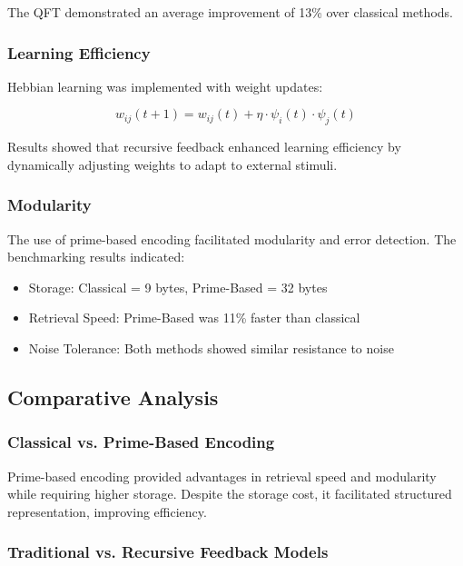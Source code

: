 \documentclass{article}
\theoremstyle{plain}
\begin{document}
\begin{itemize}
\begin{itemize}
The QFT demonstrated an average improvement of 13\% over classical methods.

\subsubsection{Learning Efficiency}

Hebbian learning was implemented with weight updates:

\begin{equation}
    w_{ij} (t+1) = w_{ij} (t) + \eta \cdot \psi_i (t) \cdot \psi_j (t)
\end{equation}

Results showed that recursive feedback enhanced learning efficiency by dynamically adjusting weights to adapt to external stimuli.

\subsubsection{Modularity}

The use of prime-based encoding facilitated modularity and error detection. The benchmarking results indicated:

\begin{itemize}
    \item Storage: Classical = 9 bytes, Prime-Based = 32 bytes
    \item Retrieval Speed: Prime-Based was 11\% faster than classical
    \item Noise Tolerance: Both methods showed similar resistance to noise
\end{itemize}

\subsection{Comparative Analysis}

\subsubsection{Classical vs. Prime-Based Encoding}

Prime-based encoding provided advantages in retrieval speed and modularity while requiring higher storage. Despite the storage cost, it facilitated structured representation, improving efficiency.

\subsubsection{Traditional vs. Recursive Feedback Models}


\end{itemize}
\end{itemize}
\end{document}
